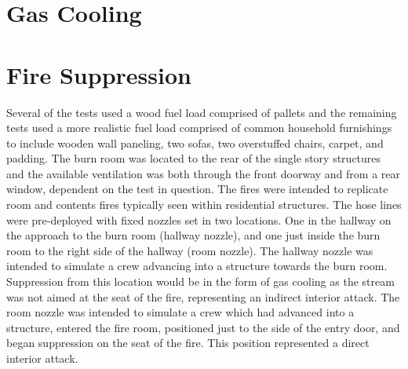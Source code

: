 \documentclass[12pt,oneside]{book}
\begin{document}
\clearpage

\section{Gas Cooling}
\label{sec:Gas_Cooling}

\section{Fire Suppression}
\label{sec:Fire_Suppression}
Several of the tests used a wood fuel load comprised of pallets and the remaining tests used a more realistic fuel load comprised of common household furnishings to include wooden wall paneling, two sofas, two overstuffed chairs, carpet, and padding.  The burn room was located to the rear of the single story structures and the available ventilation was both through the front doorway and from a rear window, dependent on the test in question.  The fires were intended to replicate room and contents fires typically seen within residential structures.  The hose lines were pre-deployed with fixed nozzles set in two locations.  One in the hallway on the approach to the burn room (hallway nozzle), and one just inside the burn room to the right side of the hallway (room nozzle). The hallway nozzle was intended to simulate a crew advancing into a structure towards the burn room. Suppression from this location would be in the form of gas cooling as the stream was not aimed at the seat of the fire, representing an indirect interior attack. The room nozzle was intended to simulate a crew which had advanced into a structure, entered the fire room, positioned just to the side of the entry door, and began suppression on the seat of the fire.  This position represented a direct interior attack.
\end{document}
